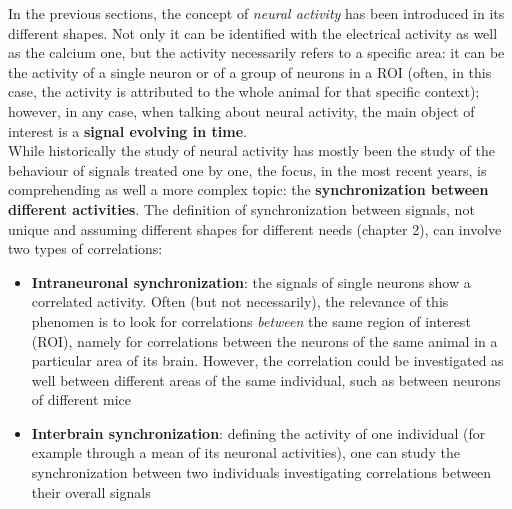 \documentclass[a4paper]{article}
\begin{document}
In the previous sections, the concept of \textit{neural activity} has been introduced in its different shapes. Not only it can be identified with the electrical activity as well as the calcium one, but the activity necessarily refers to a specific area: it can be the activity of a single neuron or of a group of neurons in a ROI (often, in this case, the activity is attributed to the whole animal for that specific context); however, in any case, when talking about neural activity, the main object of interest is a \textbf{signal evolving in time}.\\
While historically the study of neural activity has mostly been the study of the behaviour of signals treated one by one, the focus, in the most recent years, is comprehending as well a more complex topic: the \textbf{synchronization between different activities}. The definition of synchronization between signals, not unique and assuming different shapes for different needs (chapter 2), can involve two types of correlations:

\begin{itemize}
	
	\item \textbf{Intraneuronal synchronization}: the signals of  single neurons show a correlated activity. Often (but not necessarily), the relevance of this phenomen is to look for correlations \textit{between} the same region of interest (ROI), namely for correlations between the neurons of the same animal in a particular area of its brain. However, the correlation could be investigated as well between different areas of the same individual, such as between neurons of different mice
	
	\item \textbf{Interbrain synchronization}: defining the activity of one individual (for example through a mean of its neuronal activities), one can study the synchronization between two individuals investigating correlations between their overall signals
	
\end{itemize}
\end{document}
